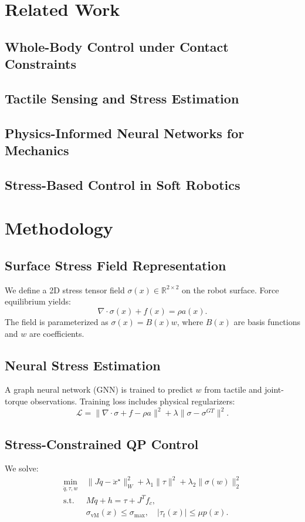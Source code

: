 \documentclass[titlepage]{ltjsarticle}
\begin{document}
\section{Related Work}
\subsection{Whole-Body Control under Contact Constraints}
\subsection{Tactile Sensing and Stress Estimation}
\subsection{Physics-Informed Neural Networks for Mechanics}
\subsection{Stress-Based Control in Soft Robotics}

\section{Methodology}
\subsection{Surface Stress Field Representation}
We define a 2D stress tensor field $\sigma(x)\in\mathbb{R}^{2\times2}$ on the robot surface.
Force equilibrium yields:
\[
\nabla\cdot\sigma(x) + f(x) = \rho a(x).
\]
The field is parameterized as $\sigma(x) = B(x)w$, where $B(x)$ are basis functions and $w$ are coefficients.

\subsection{Neural Stress Estimation}
A graph neural network (GNN) is trained to predict $w$ from tactile and joint-torque observations.
Training loss includes physical regularizers:
\[
\mathcal{L} = \|\nabla\cdot\sigma + f - \rho a\|^2 + \lambda \|\sigma - \sigma^{GT}\|^2.
\]

\subsection{Stress-Constrained QP Control}
We solve:
\begin{align*}
\min_{\ddot q, \tau, w}\ &
\|J\ddot q - \ddot x^\star\|_W^2
+ \lambda_1\|\tau\|^2
+ \lambda_2\|\sigma(w)\|_2^2 \\
\text{s.t. } &
M\ddot q + h = \tau + J^T f_c,\\
& \sigma_{\text{vM}}(x) \le \sigma_{\max},\quad
|\tau_t(x)| \le \mu p(x).
\end{align*}
\end{document}
